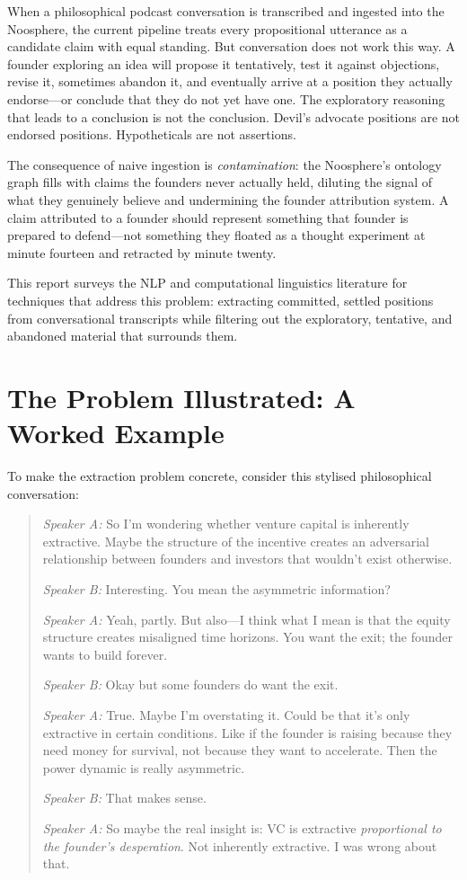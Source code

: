 \documentclass[11pt,letterpaper]{article}
\begin{document}
When a philosophical podcast conversation is transcribed and ingested into the Noosphere, the current pipeline treats every propositional utterance as a candidate claim with equal standing. But conversation does not work this way. A founder exploring an idea will propose it tentatively, test it against objections, revise it, sometimes abandon it, and eventually arrive at a position they actually endorse—or conclude that they do not yet have one. The exploratory reasoning that leads to a conclusion is not the conclusion. Devil's advocate positions are not endorsed positions. Hypotheticals are not assertions.

The consequence of naive ingestion is \textit{contamination}: the Noosphere's ontology graph fills with claims the founders never actually held, diluting the signal of what they genuinely believe and undermining the founder attribution system. A claim attributed to a founder should represent something that founder is prepared to defend—not something they floated as a thought experiment at minute fourteen and retracted by minute twenty.

This report surveys the NLP and computational linguistics literature for techniques that address this problem: extracting committed, settled positions from conversational transcripts while filtering out the exploratory, tentative, and abandoned material that surrounds them.

\section{The Problem Illustrated: A Worked Example}

To make the extraction problem concrete, consider this stylised philosophical conversation:

\begin{quote}
  \textit{Speaker A:} So I'm wondering whether venture capital is inherently extractive. Maybe the structure of the incentive creates an adversarial relationship between founders and investors that wouldn't exist otherwise.

  \textit{Speaker B:} Interesting. You mean the asymmetric information?

  \textit{Speaker A:} Yeah, partly. But also—I think what I mean is that the equity structure creates misaligned time horizons. You want the exit; the founder wants to build forever.

  \textit{Speaker B:} Okay but some founders do want the exit.

  \textit{Speaker A:} True. Maybe I'm overstating it. Could be that it's only extractive in certain conditions. Like if the founder is raising because they need money for survival, not because they want to accelerate. Then the power dynamic is really asymmetric.

  \textit{Speaker B:} That makes sense.

  \textit{Speaker A:} So maybe the real insight is: VC is extractive \textit{proportional to the founder's desperation}. Not inherently extractive. I was wrong about that.
\end{quote}
\end{document}
